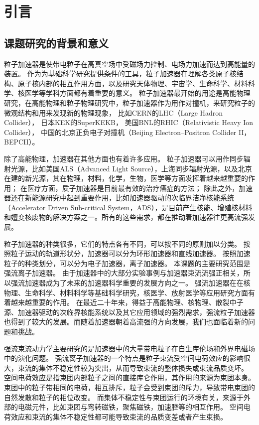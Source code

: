 
\chapter{引言}
\label{chap:Introduction}

\section{课题研究的背景和意义}
\label{section:background}
粒子加速器是使带电粒子在高真空场中受磁场力控制、电场力加速而达到高能量的装置。
作为为基础科学研究提供条件的工具，粒子加速器在理解各类原子核结构、原子核内部的相互作用方面，以及研究天体物理、宇宙学、生命科学、材料科学、核医学等学科方面都有着重要的意义。
粒子加速器最开始的用途是高能物理研究，在高能物理和粒子物理研究中，粒子加速器作为用作对撞机，来研究粒子的微观结构和用来发现新的物理现象，
比如CERN的LHC（Large Hadron Collider），
日本KEK的SuperKEKB，
美国BNL的RHIC（Relativistic Heavy Ion Collider），
中国的北京正负电子对撞机（Beijing Electron–Positron Collider II，BEPCII）。

除了高能物理，加速器在其他方面也有着许多应用。
粒子加速器可以用作同步辐射光源，比如美国ALS（Advanced Light Source），上海同步辐射光源，以及北京在建的新光源，其在物理，材料，化学，生物，医学等方面发挥着越来越重要的作用；
在医疗方面，质子加速器是目前最有效的治疗癌症的方法；
除此之外，加速器还在新能源研究中起到重要作用，比如加速器驱动的次临界洁净核能系统（Accelerator Driven Sub-critical System，ADS），是目前产生核能、增殖核材料和嬗变核废物的解决方案之一。所有的这些需求，都在推动着加速器往更高流强发展。

粒子加速器的种类很多，它们的特点各有不同，可以按不同的原则加以分类。
按照粒子运动的轨道形状分，加速器可以分为环形加速器和直线加速器。
按照加速粒子的种类划分，可以分为电子加速器，离子加速器。
本课题的主要研究范围是强流离子加速器。
由于加速器中的大部分实验事例与加速器束流流强正相关，所以强流加速器成为了未来的加速器科学重要的发展方向之一。
强流加速器在在核物理、生命科学、材料科学等基础科学研究，核医学、放射医学等应用研究方面有着越来越重要的作用。
在最近二十年来，得益于高能物理、核物理、散裂中子源、加速器驱动的次临界核能系统以及其它应用领域的强烈需求，强流粒子加速器也得到了较大的发展\cite{wei2003synchrotrons,chou2002synchrotron}。而随着加速器朝着高流强的方向发展，我们也面临着新的问题和挑战。

强流束流动力学主要研究的是加速器中的大量带电粒子在自生库伦场和外界电磁场中的演化问题。
强流离子加速器的一个特点是粒子束流受空间电荷效应的影响很大，束流的集体不稳定性较为突出，从而导致束流的整体损失或束流品质变坏。
空间电荷效应是指束团内部粒子之间的直接库仑作用，其作用的来源为束团本身。束团中的粒子带相同的电荷，相互排斥，粒子会受到束团的斥力，导致带电束团的自然发散和粒子的相位改变。
而集体不稳定性与束团运行的环境有关，来源于外部的电磁元件，比如束团与弯转磁铁，聚焦磁铁，加速腔等的相互作用。
空间电荷效应和束流的集体不稳定性都可能导致束流的品质变差或者产生束损。

